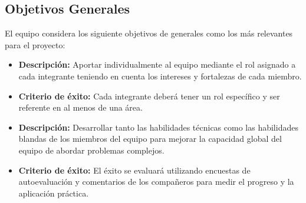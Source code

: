\subsection{Objetivos Generales}\label{sec:objetivosGenerales}

El equipo considera los siguiente objetivos de generales como los más relevantes para el proyecto: 
\begin{itemize}
    \item \textbf{Descripción:} Aportar individualmente al equipo mediante el rol asignado a cada integrante teniendo en cuenta los intereses y fortalezas de cada miembro.
    \item \textbf{Criterio de éxito:} Cada integrante deberá tener un rol específico y ser referente en al menos de una área.
    \vspace{0.5cm}
    \item \textbf{Descripción:} Desarrollar tanto las habilidades técnicas como las habilidades blandas de los miembros del equipo para mejorar la capacidad global del equipo de abordar problemas complejos.
    \item \textbf{Criterio de éxito:} El éxito se evaluará utilizando encuestas de autoevaluación y comentarios de los compañeros para medir el progreso y la aplicación práctica. 
\end{itemize}